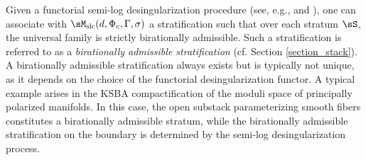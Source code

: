 \documentclass[11pt,letterpaper]{amsart}
\numberwithin{equation}{section}
\begin{document}
	Given a functorial semi-log desingularization procedure (see, e.g., \cite{Bierstone2013} and \cite[\S 10.4]{Kollar2013}), one can associate with $\sM_{\rm slc}(d,\Phi_c,\Gamma,\sigma)$ a stratification such that over each stratum $\sS$, the universal family is strictly birationally admissible. Such a stratification is referred to as a \emph{birationally admissible stratification} (cf. Section \ref{section_stack}). A birationally admissible stratification always exists but is typically not unique, as it depends on the choice of the functorial desingularization functor. A typical example arises in the KSBA compactification of the moduli space of principally polarized manifolds. In this case, the open substack parameterizing smooth fibers constitutes a birationally admissible stratum, while the birationally admissible stratification on the boundary is determined by the semi-log desingularization process.    
	
\end{document}
